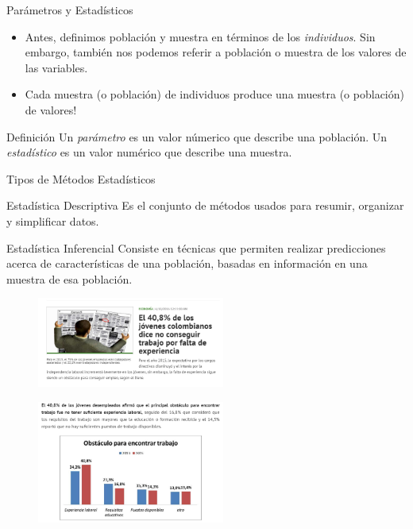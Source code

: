 \documentclass[xcolor=dvipsnames]{beamer}
\begin{document}
\begin{frame}{Parámetros y Estadísticos}
	\begin{itemize}
\justifying
\item Antes, definimos población y muestra en términos de los \emph{individuos}. Sin embargo, también nos podemos referir a población o muestra de los valores de las variables.
\item Cada muestra (o población) de individuos produce una muestra (o población) de valores! 
	\end{itemize}
\begin{block}{Definición}
\centering 
Un \emph{parámetro} es un valor númerico que describe una población. Un \emph{estadístico} es un valor numérico que describe una muestra. 
\end{block}
\end{frame}

\begin{frame}{Tipos de Métodos Estadísticos}
\begin{block}{Estadística Descriptiva}
	\justifying
Es el conjunto de métodos usados para resumir, organizar y simplificar datos.
\end{block}
\begin{block}{Estadística Inferencial}
\justifying
Consiste en técnicas que permiten realizar predicciones acerca de características de una población, basadas en información en una muestra de esa población.
\end{block}
\end{frame}


	\begin{frame}
		\begin{figure}[H]
			\includegraphics[width = 0.55\textwidth]{./graf4}
		\end{figure}
				\begin{figure}[H]
					\includegraphics[width = 0.55\textwidth]{./graf5}
				\end{figure}
	\end{frame}
	
\end{document}
